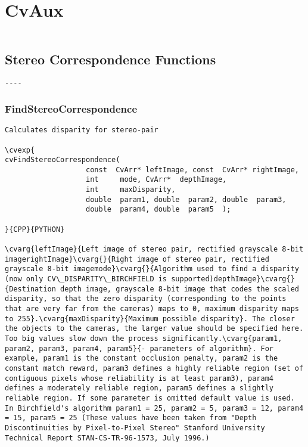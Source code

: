 \chapter{CvAux}

\begin{verbatim}
\end{verbatim}
\section{Stereo Correspondence Functions}
\begin{verbatim}
----
\end{verbatim}
\subsection{FindStereoCorrespondence}
\begin{verbatim}
Calculates disparity for stereo-pair

\cvexp{
cvFindStereoCorrespondence(
                   const  CvArr* leftImage, const  CvArr* rightImage,
                   int     mode, CvArr*  depthImage,
                   int     maxDisparity,
                   double  param1, double  param2, double  param3,
                   double  param4, double  param5  );

}{CPP}{PYTHON}

\cvarg{leftImage}{Left image of stereo pair, rectified grayscale 8-bit imagerightImage}\cvarg{}{Right image of stereo pair, rectified grayscale 8-bit imagemode}\cvarg{}{Algorithm used to find a disparity (now only CV\_DISPARITY\_BIRCHFIELD is supported)depthImage}\cvarg{}{Destination depth image, grayscale 8-bit image that codes the scaled disparity, so that the zero disparity (corresponding to the points that are very far from the cameras) maps to 0, maximum disparity maps to 255}.\cvarg{maxDisparity}{Maximum possible disparity}. The closer the objects to the cameras, the larger value should be specified here. Too big values slow down the process significantly.\cvarg{param1, param2, param3, param4, param5}{- parameters of algorithm}. For example, param1 is the constant occlusion penalty, param2 is the constant match reward, param3 defines a highly reliable region (set of contiguous pixels whose reliability is at least param3), param4 defines a moderately reliable region, param5 defines a slightly reliable region. If some parameter is omitted default value is used. In Birchfield's algorithm param1 = 25, param2 = 5, param3 = 12, param4 = 15, param5 = 25 (These values have been taken from "Depth Discontinuities by Pixel-to-Pixel Stereo" Stanford University Technical Report STAN-CS-TR-96-1573, July 1996.)


\end{verbatim}
